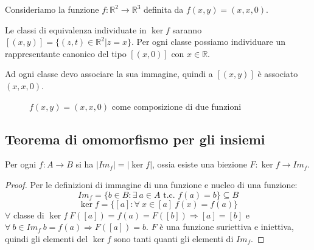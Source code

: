 \begin{exmp}
Consideriamo la funzione $f : \mathbb{R}^2 \to \mathbb{R}^3$ definita da $f(x,y) = (x,x,0)$.

Le classi di equivalenza individuate in $\ker f$ saranno $[(x,y)] = \{ (z,t) \in \mathbb{R}^2 | z = x\}$. Per ogni classe possiamo individuare un rappresentante canonico del tipo $[(x,0)]$ con $x \in \mathbb{R}$.

Ad ogni classe devo associare la sua immagine, quindi a $[(x,y)]$ \`e associato $(x,x,0)$.

\begin{figure}[ht]
\centering
{}
\caption{$f(x,y) = (x,x,0)$ come composizione di due funzioni}
\end{figure}
\end{exmp}

\subsection{Teorema di omomorfismo per gli insiemi}
\begin{prop}
Per ogni $f : A \to B$ si ha $|Im_f| = |\ker f|$, ossia esiste una biezione $F : \ker f \to Im_f$.
\end{prop}
\begin{proof}
Per le definizioni di immagine di una funzione e nucleo di una funzione:
\[
Im_f = \{ b \in B : \exists \ a \in A \text{ t.c. } f(a) = b \}\subseteq B
\]
\[
\ker f = \{ [a] : \forall \ x \in [a] \ f(x) = f(a) \}
\]
$ \forall $ classe di $ \ker f \ F([a]) = f(a) = F([b]) \Rightarrow [a] = [b]$ e $\forall \ b \in Im_f \ b = f(a) \Rightarrow F([a]) = b$. $F$ \`e una funzione suriettiva e iniettiva, quindi gli elementi del $\ker f$ sono tanti quanti gli elementi di $Im_f$.
\end{proof}

